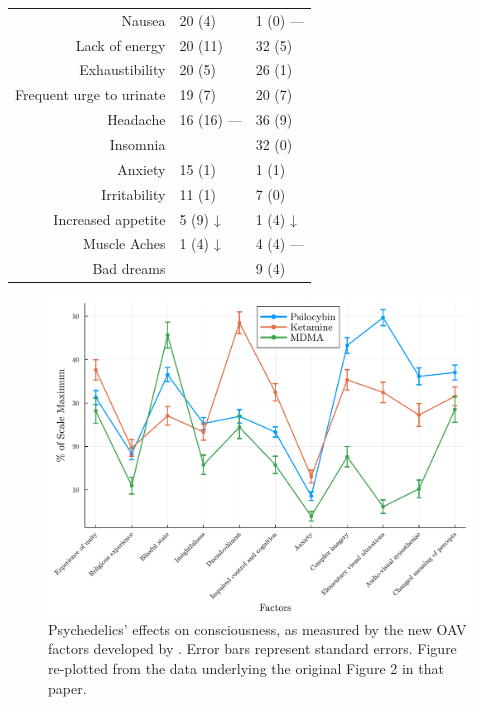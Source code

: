 \documentclass[12pt,letterpaper]{book}
\begin{document}
\begin{table}[htbp]
\begin{tabular}{|r|l|l|}
        Nausea                   & 20 (4)  & 1\phantom{0} (0) —\\
        Lack of energy           & 20 (11) & 32 (5)\\
        Exhaustibility           & 20 (5)  & 26 (1)\\
        Frequent urge to urinate & 19 (7)  & 20 (7)\\
        Headache                 & 16 (16) — & 36 (9)\\
        Insomnia                 &                            & 32 (0)\\
        Anxiety                  & 15 (1)  & 1\phantom{0} (1)\\
        Irritability             & 11 (1)  & 7\phantom{0} (0)\\
        Increased appetite       & 5\phantom{0} (9) ↓ & 1\phantom{0} (4) ↓\\
        Muscle Aches             & 1\phantom{0} (4) ↓ & 4\phantom{0} (4) —\\
        Bad dreams               &                                    & 9\phantom{0} (4)\\
        \hline
    \end{tabular}
\end{table}
\FloatBarrier
\begin{figure}[htbp]
  \centering
  \includegraphics[width=\textwidth]{oavvalidationfigure2data/effects_plot.pdf}
  \caption{Psychedelics' effects on consciousness, as measured by the new OAV factors developed by \textcite{studerus2010psychometric}. Error bars represent standard errors. Figure re-plotted from the data underlying the original Figure 2 in that paper.}
  \label{consciousEffects}
\end{figure}
\FloatBarrier
\end{document}

